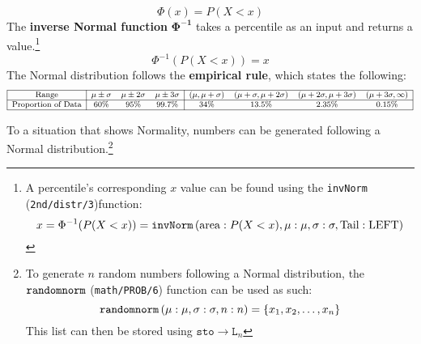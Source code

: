 \documentclass[../AP_Statistics.tex]{subfiles}
\begin{document}
			\[\Phi(x) = P(X < x)\]
			The \textbf{inverse Normal function} $\pmb{\Phi^{-1}}$ takes a percentile as an input and returns a value.\footnote{A percentile's corresponding $x$ value can be found using the \texttt{invNorm} (\texttt{2nd/distr/3})function:\[x = \Phi^{-1}(P(X < x)) = \operatorname{\texttt{invNorm}}\left(\mathrm{area}:P(X < x), \mu: \mu, \sigma: \sigma, \mathrm{Tail: LEFT}\right)\]}
			\[\Phi^{-1}(P(X < x)) = x\]
			The Normal distribution follows the \textbf{empirical rule}, which states the following:
			\[\footnotesize\begin{array}{|c|ccc|cccc|}\hline
				\rm{Range} & \mu \pm \sigma & \mu \pm 2\sigma & \mu \pm 3\sigma & (\mu, \mu + \sigma) & (\mu + \sigma, \mu + 2\sigma) & (\mu + 2\sigma, \mu + 3\sigma) & (\mu + 3\sigma, \infty)\\\hline
				\text{Proportion\index{proportion} of Data} & 60\% & 95\% & 99.7\% & 34\% & 13.5\% & 2.35\% & 0.15\% \\\hline
			\end{array}\]
			\begin{center}
			\end{center}
			To  a situation that shows Normality,  numbers can be generated following a Normal distribution.\footnote{To generate $n$ random numbers following a Normal distribution, the $\operatorname{\texttt{randomnorm}}$ (\texttt{math/PROB/6}) function can be used as such:\[\operatorname{\texttt{randomnorm}}\left(\mu: \mu, \sigma: \sigma, n: n\right) = \{x_1, x_2 , \ldots, x_n\}\]This list can then be stored using $\texttt{sto}\to\texttt{L}_n$}
\end{document}
